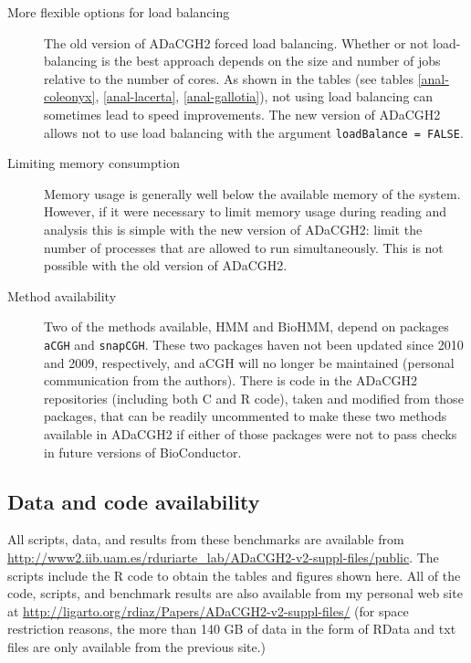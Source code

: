 \documentclass[a4paper,11pt]{article}
\begin{document}
\begin{description}


\item[More flexible options for load balancing] The old version of ADaCGH2
  forced load balancing. Whether or not load-balancing is the best
  approach depends on the size and number of jobs relative to the number
  of cores. As shown in the tables (see tables \ref{anal-coleonyx},
  \ref{anal-lacerta}, \ref{anal-gallotia}), not using load balancing can
  sometimes lead to speed improvements. The new version of ADaCGH2 allows
  not to use load balancing with the argument \texttt{loadBalance = FALSE}.

\item[Limiting memory consumption] Memory usage is generally well below
  the available memory of the system. However, if it were necessary to
  limit memory usage during reading and analysis this is simple with the
  new version of ADaCGH2: limit the number of processes that are allowed
  to run simultaneously. This is not possible with the old version of
  ADaCGH2.

\item[Method availability] Two of the methods available, HMM and BioHMM,
  depend on packages \texttt{aCGH} and \texttt{snapCGH}. These two
  packages haven not been updated since 2010 and 2009, respectively, and
  aCGH will no longer be maintained (personal communication from the
  authors). There is code in the ADaCGH2 repositories (including both C
  and R code), taken and modified from those packages, that can be readily
  uncommented to make these two methods available in ADaCGH2 if either of
  those packages were not to pass checks in future versions of
  BioConductor.
 
\end{description}



\subsection{Data and code availability}

All scripts, data, and results from these benchmarks are available from
\url{http://www2.iib.uam.es/rduriarte\_lab/ADaCGH2-v2-suppl-files/public}. The
scripts include the R code to obtain the tables and figures shown
here. All of the code, scripts, and benchmark results are also available
from my personal web site at
\url{http://ligarto.org/rdiaz/Papers/ADaCGH2-v2-suppl-files/} (for space
restriction reasons, the more than 140 GB of data in the form of RData and
txt files are only available from the previous site.)
\end{document}
